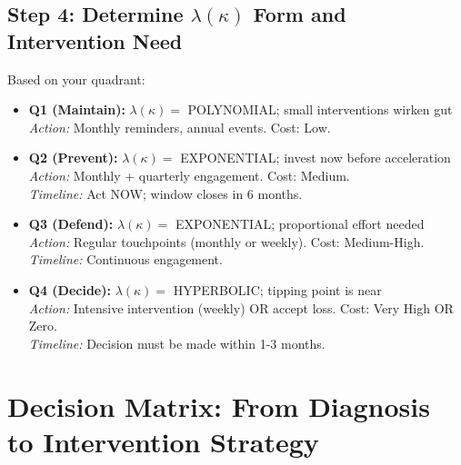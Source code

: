 \documentclass[11pt, a4paper]{article}
\begin{document}
\subsection{Step 4: Determine $\lambda(\kappa)$ Form and Intervention Need}

Based on your quadrant:

\begin{itemize}
    \item \textbf{Q1 (Maintain):} $\lambda(\kappa) = $ POLYNOMIAL; small interventions wirken gut
    \\ \textit{Action:} Monthly reminders, annual events. Cost: Low.

    \item \textbf{Q2 (Prevent):} $\lambda(\kappa) = $ EXPONENTIAL; invest now before acceleration
    \\ \textit{Action:} Monthly + quarterly engagement. Cost: Medium.
    \\ \textit{Timeline:} Act NOW; window closes in 6 months.

    \item \textbf{Q3 (Defend):} $\lambda(\kappa) = $ EXPONENTIAL; proportional effort needed
    \\ \textit{Action:} Regular touchpoints (monthly or weekly). Cost: Medium-High.
    \\ \textit{Timeline:} Continuous engagement.

    \item \textbf{Q4 (Decide):} $\lambda(\kappa) = $ HYPERBOLIC; tipping point is near
    \\ \textit{Action:} Intensive intervention (weekly) OR accept loss. Cost: Very High OR Zero.
    \\ \textit{Timeline:} Decision must be made within 1-3 months.
\end{itemize}


\section{Decision Matrix: From Diagnosis to Intervention Strategy}
\end{document}
